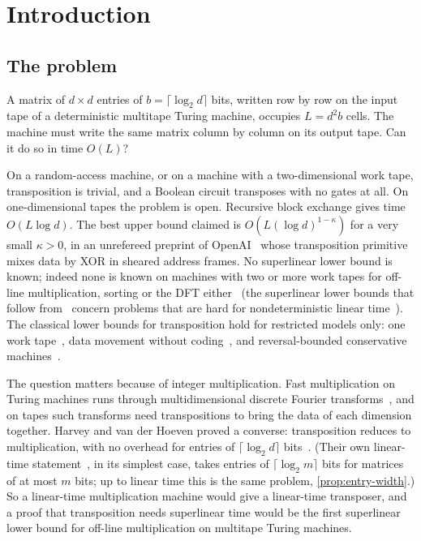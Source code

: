 \section{Introduction}\label{sec:intro}

\subsection{The problem}

A matrix of $d\times d$ entries of $b=\lceil\log_2d\rceil$ bits, written row by row on the input tape of a
deterministic multitape Turing machine, occupies $L=d^2b$ cells. The machine must write the same matrix column
by column on its output tape. Can it do so in time $O(L)$?

On a random-access machine, or on a machine with a two-dimensional work tape, transposition is trivial, and a
Boolean circuit transposes with no gates at all. On one-dimensional tapes the problem is open. Recursive block
exchange gives time $O(L\log d)$. The best upper bound claimed is $O(L(\log d)^{1-\kappa})$ for a very small
$\kappa>0$, in an unrefereed preprint of OpenAI~\cite{OpenAI2026mult} whose transposition primitive mixes data by
XOR in sheared address frames. No superlinear lower bound is known; indeed none is known on machines with two or more work tapes for
off-line multiplication, sorting or the DFT either~\cite[\S1.4]{HvdH2025} (the superlinear lower bounds that
follow from~\cite{PPST1983} concern problems that are hard for nondeterministic linear time~\cite{Grandjean1988}).
The classical lower bounds for transposition hold for restricted models only: one work
tape~\cite{DMS1991,DietzfelbingerMaass1993}, data movement without coding~\cite{Stoss1973}, and reversal-bounded
conservative machines~\cite{Kirchherr1988}.

The question matters because of integer multiplication. Fast multiplication on Turing machines runs through
multidimensional discrete Fourier transforms~\cite{SchonhageStrassen1971,HvdH2021}, and on tapes such transforms
need transpositions to bring the data of each dimension together. Harvey and van der Hoeven proved a converse:
transposition reduces to multiplication, with no overhead for entries of $\lceil\log_2d\rceil$ bits~\cite[Cor.~6.9]{HvdH2025}. (Their own linear-time statement~\cite[Thm.~6.11]{HvdH2025}, in its simplest case, takes entries of $\lceil\log_2m\rceil$ bits for matrices of at most $m$ bits; up to linear time this is the same problem, \cref{prop:entry-width}.) So a linear-time multiplication machine would give a linear-time transposer, and a proof that transposition needs
superlinear time would be the first superlinear lower bound for off-line multiplication on multitape Turing
machines.

